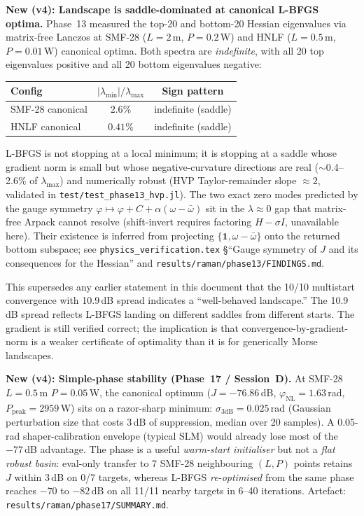 \documentclass[12pt,a4paper]{article}
\theoremstyle{definition}
\begin{document}
\begin{advisory}
\textbf{New (v4): Landscape is saddle-dominated at canonical L-BFGS optima.}
Phase~13 measured the top-20 and bottom-20 Hessian eigenvalues via
matrix-free Lanczos at SMF-28 ($L=2$\,m, $P=0.2$\,W) and HNLF ($L=0.5$\,m,
$P=0.01$\,W) canonical optima. Both spectra are \emph{indefinite}, with all
20 top eigenvalues positive and all 20 bottom eigenvalues negative:
\begin{center}
\small
\begin{tabular}{lcc}
\toprule
Config & $|\lambda_\text{min}|/\lambda_\text{max}$ & Sign pattern \\
\midrule
SMF-28 canonical & $2.6\%$ & indefinite (saddle) \\
HNLF canonical   & $0.41\%$ & indefinite (saddle) \\
\bottomrule
\end{tabular}
\end{center}
L-BFGS is not stopping at a local minimum; it is stopping at a saddle whose
gradient norm is small but whose negative-curvature directions are real
($\sim$0.4--2.6\% of $\lambda_\text{max}$) and numerically robust (HVP
Taylor-remainder slope $\approx 2$, validated in \texttt{test/test\_phase13\_hvp.jl}).
The two exact zero modes predicted by the
gauge symmetry $\varphi \mapsto \varphi + C + \alpha(\omega-\bar\omega)$
sit in the $\lambda \approx 0$ gap that matrix-free Arpack cannot resolve
(shift-invert requires factoring $H - \sigma I$, unavailable here). Their
existence is inferred from projecting $\{\mathbf{1}, \omega-\bar\omega\}$
onto the returned bottom subspace; see \texttt{physics\_verification.tex}
\S``Gauge symmetry of $J$ and its consequences for the Hessian''
and \texttt{results/raman/phase13/FINDINGS.md}.

This supersedes any earlier statement in this document that the 10/10
multistart convergence with 10.9\,dB spread indicates a ``well-behaved
landscape.'' The 10.9\,dB spread reflects L-BFGS landing on different
saddles from different starts. The gradient is still verified correct; the
implication is that convergence-by-gradient-norm is a weaker certificate of
optimality than it is for generically Morse landscapes.
\end{advisory}

\begin{advisory}
\textbf{New (v4): Simple-phase stability (Phase~17 / Session~D).} At
SMF-28 $L=0.5$\,m $P=0.05$\,W, the canonical optimum
($J = -76.86$\,dB, $\varphi_\text{NL}=1.63$\,rad, $P_\text{peak}=2959$\,W)
sits on a razor-sharp minimum: $\sigma_{3\text{dB}} = 0.025$\,rad
(Gaussian perturbation size that costs 3\,dB of suppression,
median over 20 samples). A 0.05-rad shaper-calibration envelope (typical
SLM) would already lose most of the $-77$\,dB advantage. The phase is a
useful \emph{warm-start initialiser} but not a \emph{flat robust basin}:
eval-only transfer to 7 SMF-28 neighbouring $(L,P)$ points retains $J$
within 3\,dB on 0/7 targets, whereas L-BFGS \emph{re-optimised} from the
same phase reaches $-70$ to $-82$\,dB on all 11/11 nearby targets in 6--40
iterations. Artefact: \texttt{results/raman/phase17/SUMMARY.md}.
\end{advisory}
\end{document}
